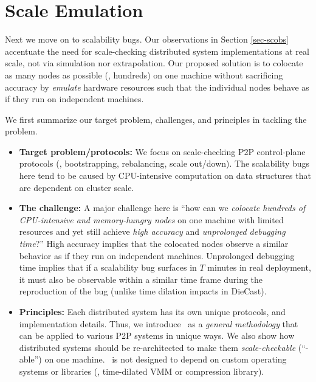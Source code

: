 \section{Scale Emulation}

Next we move on to scalability bugs. Our observations in Section \ref{sec-scobs}
accentuate the need for scale-checking distributed system implementations at
real scale, not via simulation nor extrapolation. 
%
Our proposed solution is to colocate as many nodes as possible (\eg, hundreds)
on one machine without sacrificing accuracy by {\em emulate} hardware resources
such that the individual nodes behave as if they run on independent machines.

We first summarize our target problem, challenges, and principles in tackling
the problem.

\begin{itemize}

\item {\bf Target problem/protocols:} We focus on scale-checking P2P
control-plane protocols (\eg, bootstrapping, rebalancing, scale out/down). The
scalability bugs here tend to be caused by CPU-intensive computation on data
structures that are dependent on cluster scale.

\item {\bf The challenge:} A major challenge here is
%
``how can we {\em colocate hundreds of CPU-intensive and memory-hungry nodes} on
one machine with limited resources and yet still achieve {\em high accuracy} and
{\em unprolonged debugging time}?''
%
High accuracy implies that the colocated nodes observe a similar behavior as if
they run on independent machines.
%
Unprolonged debugging time implies that if a scalability bug surfaces in $T$
minutes in real deployment, it must also be observable within a similar time
frame during the reproduction of the bug (unlike time dilation impacts in
DieCast).

\item {\bf Principles:}
%
Each distributed system has its own unique protocols, and implementation
details. Thus, we introduce \sck\ as a {\em general methodology} that can be
applied to various P2P systems in unique ways.
%
We also show how distributed systems should be re-architected to make them {\em
scale-checkable} (``\sck-able'') on one machine.
%
\sck\ is not designed to depend on custom operating systems or libraries (\eg,
time-dilated VMM or compression library).

\end{itemize}


